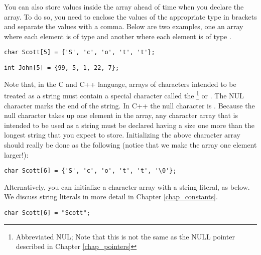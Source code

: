 
You can also store values inside the array ahead of time when you declare the array. 
To do so, you need to enclose the values of the appropriate type in brackets and separate the values with a comma. 
Below are two examples, one an array where each element is of type  and another where each element is of type .

\noindent\begin{minipage}{\linewidth}\begin{lstlisting}
char Scott[5] = {'S', 'c', 'o', 't', 't'};	
\end{lstlisting}\end{minipage}

\noindent\begin{minipage}{\linewidth}\begin{lstlisting}
int John[5] = {99, 5, 1, 22, 7};
\end{lstlisting}\end{minipage}
	
Note that, in the C and C++ language, arrays of characters intended to be treated as a string must contain a special character called the \footnote{Abbreviated NUL; Note that this is not the same as the NULL pointer described in Chapter \ref{chap_pointers}} or . 
The NUL character marks the end of the string. 
In C++ the null character is . 
Because the null character takes up one element in the array, any character array that is intended to be used as a string must be declared having a size one more than the longest string that you expect to store. 
Initializing the above character array should really be done as the following (notice that we make the array one element larger!):

\noindent\begin{minipage}{\linewidth}\begin{lstlisting}
char Scott[6] = {'S', 'c', 'o', 't', 't', '\0'};	
\end{lstlisting}\end{minipage}

Alternatively, you can initialize a character array with a string literal, as below. 
We discuss string literals in more detail in Chapter \ref{chap_constants}.

\noindent\begin{minipage}{\linewidth}\begin{lstlisting}
char Scott[6] = "Scott";	
\end{lstlisting}\end{minipage}

